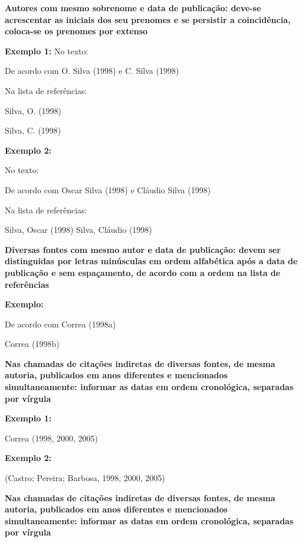 \vspace{0.5cm}\noindent\textbf{Autores com mesmo sobrenome e data de publicação: deve-se acrescentar as iniciais dos seu prenomes e se persistir a coincidência, coloca-se os prenomes por extenso}

\vspace{0.5cm}\noindent\textbf{Exemplo 1:}
\noindent No texto:

De acordo com O. Silva (1998) e C. Silva (1998)

\noindent Na lista de referências:

Silva, O. (1998)

Silva, C. (1998)

\vspace{0.5cm}\noindent\textbf{Exemplo 2:}

\noindent No texto:

De acordo com Oscar Silva (1998) e Cláudio Silva (1998)

\noindent Na lista de referências:

Silva, Oscar (1998)
Silva, Cláudio (1998)

\vspace{0.5cm}\noindent\textbf{Diversas fontes com mesmo autor e data de publicação: devem ser distinguidas por letras minúsculas em ordem alfabética após a data de publicação e sem espaçamento, de acordo com a ordem na lista de referências}

\vspace{0.5cm}\noindent\textbf{Exemplo:}

De acordo com Correa (1998a)

Correa (1998b)

\vspace{0.5cm}\noindent\textbf{Nas chamadas de citações indiretas de diversas fontes, de mesma autoria, publicados em anos diferentes e mencionados simultaneamente: informar as datas em ordem cronológica, separadas por vírgula}

\vspace{0.5cm}\noindent\textbf{Exemplo 1:}

Correa (1998, 2000, 2005)

\vspace{0.5cm}\noindent\textbf{Exemplo 2:}

(Castro; Pereira; Barbosa, 1998, 2000, 2005)

\vspace{0.5cm}\noindent\textbf{Nas chamadas de citações indiretas de diversas fontes, de mesma autoria, publicados em anos diferentes e mencionados simultaneamente: informar as datas em ordem cronológica, separadas por vírgula}

